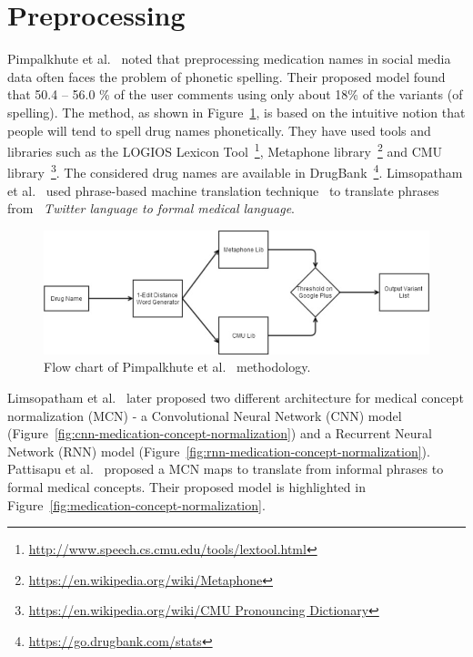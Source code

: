 \section{Preprocessing}

Pimpalkhute et al.~\cite{pimpalkhute2014phonetic} noted that preprocessing medication names in social media data often faces the problem of phonetic spelling. Their proposed model found that 50.4 – 56.0 \% of the user comments using only about 18\% of the variants (of spelling). The method, as shown in Figure~\ref{fig:model-pimpalkhute}, is based on the intuitive notion that people will tend to spell drug names phonetically. They have used tools and libraries such as the LOGIOS Lexicon Tool~\footnote{\url{http://www.speech.cs.cmu.edu/tools/lextool.html}}, Metaphone library~\footnote{\url{https://en.wikipedia.org/wiki/Metaphone}} and CMU library~\footnote{\url{https://en.wikipedia.org/wiki/CMU Pronouncing Dictionary}}. The considered drug names are available in DrugBank~\footnote{\url{https://go.drugbank.com/stats}}. Limsopatham et al.~\cite{limsopatham2015adapting} used phrase-based machine translation technique~\cite{koehn2003statistical} to translate phrases from ~\textit{Twitter language to formal medical language}.

\begin{figure}[h]
	\centering
	\includegraphics[width=0.99\linewidth]{Figures/m.png}
	\caption{Flow chart of Pimpalkhute et al.~\cite{pimpalkhute2014phonetic} methodology.}
	\label{fig:model-pimpalkhute}
\end{figure}

Limsopatham et al.~\cite{limsopatham2016normalising} later proposed two different architecture for medical concept normalization (MCN) - a Convolutional Neural Network (CNN) model (Figure~\ref{fig:cnn-medication-concept-normalization}) and a Recurrent Neural Network (RNN) model (Figure~\ref{fig:rnn-medication-concept-normalization}). Pattisapu et al.~\cite{PATTISAPU2020103522} proposed a MCN  maps to translate from informal phrases to formal medical concepts. Their proposed model is highlighted in Figure~\ref{fig:medication-concept-normalization}.


